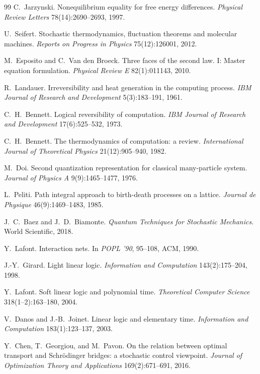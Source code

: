 \documentclass[11pt]{article}
\theoremstyle{plain}
\theoremstyle{definition}
\theoremstyle{remark}
\begin{document}
\begin{thebibliography}{99}
C.~Jarzynski. Nonequilibrium equality for free energy differences. \emph{Physical Review Letters} 78(14):2690--2693, 1997.

U.~Seifert. Stochastic thermodynamics, fluctuation theorems and molecular machines. \emph{Reports on Progress in Physics} 75(12):126001, 2012.

M.~Esposito and C.~Van den Broeck. Three faces of the second law. I: Master equation formulation. \emph{Physical Review E} 82(1):011143, 2010.

R.~Landauer. Irreversibility and heat generation in the computing process. \emph{IBM Journal of Research and Development} 5(3):183--191, 1961.

C.~H.~Bennett. Logical reversibility of computation. \emph{IBM Journal of Research and Development} 17(6):525--532, 1973.

C.~H.~Bennett. The thermodynamics of computation: a review. \emph{International Journal of Theoretical Physics} 21(12):905--940, 1982.

M.~Doi. Second quantization representation for classical many-particle system. \emph{Journal of Physics A} 9(9):1465--1477, 1976.

L.~Peliti. Path integral approach to birth-death processes on a lattice. \emph{Journal de Physique} 46(9):1469--1483, 1985.

J.~C.~Baez and J.~D.~Biamonte. \emph{Quantum Techniques for Stochastic Mechanics.} World Scientific, 2018.

Y.~Lafont. Interaction nets. In \emph{POPL '90}, 95--108, ACM, 1990.

J.-Y.~Girard. Light linear logic. \emph{Information and Computation} 143(2):175--204, 1998.

Y.~Lafont. Soft linear logic and polynomial time. \emph{Theoretical Computer Science} 318(1--2):163--180, 2004.

V.~Danos and J.-B.~Joinet. Linear logic and elementary time. \emph{Information and Computation} 183(1):123--137, 2003.

Y.~Chen, T.~Georgiou, and M.~Pavon. On the relation between optimal transport and Schrödinger bridges: a stochastic control viewpoint. \emph{Journal of Optimization Theory and Applications} 169(2):671--691, 2016.

\end{thebibliography}
\end{document}
